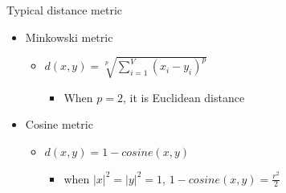 \documentclass[
  ignorenonframetext,
]{beamer}
\providecommand{\tightlist}{%
  \setlength{\itemsep}{0pt}\setlength{\parskip}{0pt}}
\begin{document}
\begin{frame}{Typical distance metric}
\protect\hypertarget{typical-distance-metric}{}
\begin{itemize}
\item
  Minkowski metric

  \begin{itemize}
  \item
    \(d(x,y) = \sqrt[p]{\sum^V_{i=1}{(x_i-y_i)^p}}\)

    \begin{itemize}
    \tightlist
    \item
      When \(p=2\), it is {Euclidean distance}
    \end{itemize}
  \end{itemize}
\item
  Cosine metric

  \begin{itemize}
  \item
    \(𝑑(x,y)=1−cosine(x,y)\)

    \begin{itemize}
    \tightlist
    \item
      when \(|x|^2=|y|^2=1\), \(1−cosine(x,y)=\frac{r^2}{2}\)
    \end{itemize}
  \end{itemize}
\end{itemize}
\end{frame}
\end{document}
